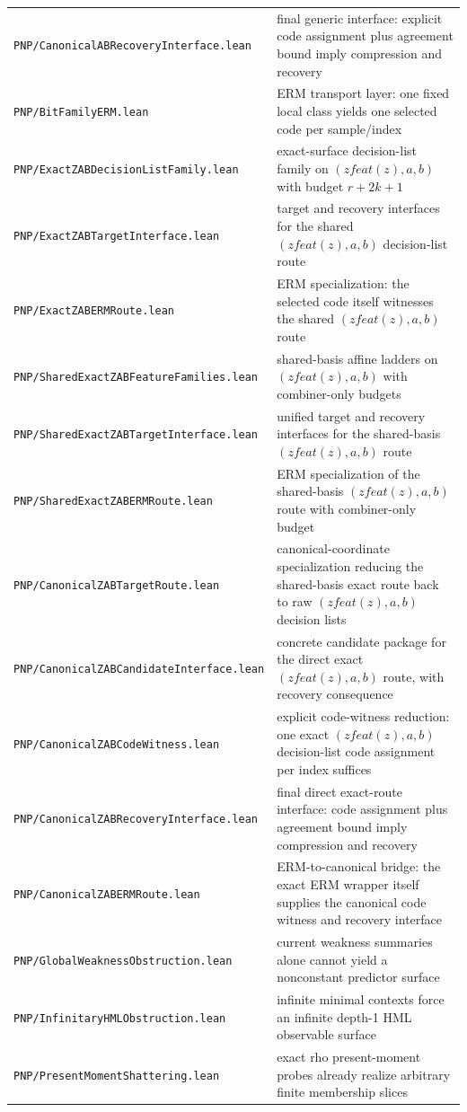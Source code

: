 \documentclass[11pt]{article}
\theoremstyle{remark}
\begin{document}
\begin{center}
\begin{tabular}{ll}
\texttt{PNP/CanonicalABRecoveryInterface.lean} & final generic interface: explicit code assignment plus agreement bound imply compression and recovery \\
\texttt{PNP/BitFamilyERM.lean} & ERM transport layer: one fixed local class yields one selected code per sample/index \\
\texttt{PNP/ExactZABDecisionListFamily.lean} & exact-surface decision-list family on $(zfeat(z),a,b)$ with budget $r+2k+1$ \\
\texttt{PNP/ExactZABTargetInterface.lean} & target and recovery interfaces for the shared $(zfeat(z),a,b)$ decision-list route \\
\texttt{PNP/ExactZABERMRoute.lean} & ERM specialization: the selected code itself witnesses the shared $(zfeat(z),a,b)$ route \\
\texttt{PNP/SharedExactZABFeatureFamilies.lean} & shared-basis affine ladders on $(zfeat(z),a,b)$ with combiner-only budgets \\
\texttt{PNP/SharedExactZABTargetInterface.lean} & unified target and recovery interfaces for the shared-basis $(zfeat(z),a,b)$ route \\
\texttt{PNP/SharedExactZABERMRoute.lean} & ERM specialization of the shared-basis $(zfeat(z),a,b)$ route with combiner-only budget \\
\texttt{PNP/CanonicalZABTargetRoute.lean} & canonical-coordinate specialization reducing the shared-basis exact route back to raw $(zfeat(z),a,b)$ decision lists \\
\texttt{PNP/CanonicalZABCandidateInterface.lean} & concrete candidate package for the direct exact $(zfeat(z),a,b)$ route, with recovery consequence \\
\texttt{PNP/CanonicalZABCodeWitness.lean} & explicit code-witness reduction: one exact $(zfeat(z),a,b)$ decision-list code assignment per index suffices \\
\texttt{PNP/CanonicalZABRecoveryInterface.lean} & final direct exact-route interface: code assignment plus agreement bound imply compression and recovery \\
\texttt{PNP/CanonicalZABERMRoute.lean} & ERM-to-canonical bridge: the exact ERM wrapper itself supplies the canonical code witness and recovery interface \\
\texttt{PNP/GlobalWeaknessObstruction.lean} & current weakness summaries alone cannot yield a nonconstant predictor surface \\
\texttt{PNP/InfinitaryHMLObstruction.lean} & infinite minimal contexts force an infinite depth-1 HML observable surface \\
\texttt{PNP/PresentMomentShattering.lean} & exact rho present-moment probes already realize arbitrary finite membership slices \\
\bottomrule
\end{tabular}
\end{center}
\end{document}
